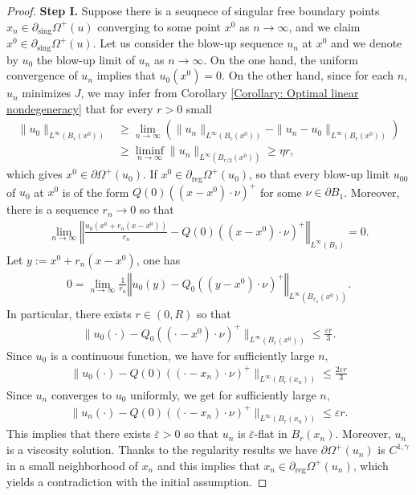 \documentclass[11pt,reqno]{amsart}
\begin{document}
\begin{proof}
	\textbf{Step I.} Suppose there is a seuqnece of singular free boundary points $x_{n}\in\partial_{\mathrm{sing}}\varOmega^{+}(u)$ converging to some point $x^{0}$ as $n\to\infty$, and we claim $x^{0}\in\partial_{\mathrm{sing}}\varOmega^{+}(u)$. Let us consider the blow-up sequence $u_{n}$ at $x^{0}$ and we denote by $u_{0}$ the blow-up limit of $u_{n}$ as $n\to\infty$. On the one hand, the uniform convergence of $u_{n}$ implies that $u_{0}(x^{0})=0$. On the other hand, since for each $n$, $u_{n}$ minimizes $J$, we may infer from Corollary \ref{Corollary: Optimal linear nondegeneracy} that for every $r>0$ small
	\begin{align*}
		\|u_{0}\|_{L^{\infty}(B_{r}(x^{0}))}&\geqslant\lim_{n\to\infty}(\|u_{n}\|_{L^{\infty}(B_{r}(x^{0}))}-\|u_{n}-u_{0}\|_{L^{\infty}(B_{r}(x^{0}))})\\
		&\geqslant\liminf_{n\to\infty}\|u_{n}\|_{L^{\infty}(B_{r/2}(x^{0}))}\geqslant\eta r,
	\end{align*}
	which gives $x^{0}\in\partial\varOmega^{+}(u_{0})$. If $x^{0}\in\partial_{\mathrm{reg}}\varOmega^{+}(u_{0})$, so that every blow-up limit $u_{00}$ of $u_{0}$ at $x^{0}$ is of the form $Q(0)((x-x^{0})\cdot\nu)^{+}$ for some $\nu\in\partial B_{1}$. Moreover, there is a sequence $r_{n}\to0$ so that
	\begin{align*}
		\lim_{n\to\infty}\left\Vert\frac{u_{0}(x^{0}+r_{n}(x-x^{0}))}{r_{n}}-Q(0)((x-x^{0})\cdot\nu)^{+}\right\Vert_{L^{\infty}(B_{1})}=0.
	\end{align*}
	Let $y:=x^{0}+r_{n}(x-x^{0})$, one has
	\begin{align*}
		0=\lim_{n\to\infty}\frac{1}{r_{n}}\left\Vert u_{0}(y)-Q_{0}((y-x^{0})\cdot\nu)^{+}\right\Vert_{L^{\infty}(B_{r_{n}}(x^{0}))}.
	\end{align*}
	In particular, there exists $r\in(0,R)$ so that 
	\begin{align*}
		\|u_{0}(\cdot)-Q_{0}((\cdot-x^{0})\cdot\nu)^{+}\|_{L^{\infty}(B_{r}(x^{0}))}\leqslant\frac{\varepsilon r}{3}.
	\end{align*}
	Since $u_{0}$ is a continuous function, we have for sufficiently large $n$,
	\begin{align*}
		\|u_{0}(\cdot)-Q(0)((\cdot-x_{n})\cdot\nu)^{+}\|_{L^{\infty}(B_{r}(x_{n}))}\leqslant\frac{2\varepsilon r}{3}
	\end{align*}
	Since $u_{n}$ converges to $u_{0}$ uniformly, we get for sufficiently large $n$,
	\begin{align*}
		\|u_{n}(\cdot)-Q(0)((\cdot-x_{n})\cdot\nu)^{+}\|_{L^{\infty}(B_{r}(x_{n}))}\leqslant\varepsilon r.
	\end{align*}
	This implies that there exists $\bar{\varepsilon}>0$ so that $u_{n}$ is $\bar{\varepsilon}$-flat in $B_{r}(x_{n})$. Moreover, $u_{n}$ is a viscosity solution. Thanks to the regularity results we have $\partial\varOmega^{+}(u_{n})$ is $C^{1,\gamma}$ in a small neighborhood of $x_{n}$ and this implies that $x_{n}\in\partial_{\mathrm{reg}}\varOmega^{+}(u_{n})$, which yields a contradiction with the initial assumption.
	

\end{proof}
\end{document}
